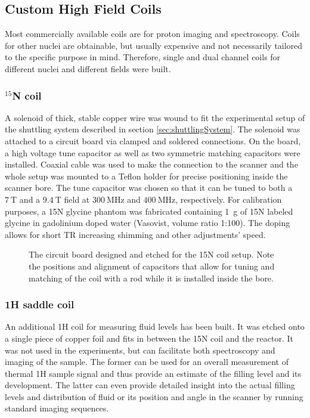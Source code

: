         \subsection{Custom High Field Coils}
            Most commercially available coils are for proton imaging and spectroscopy. Coils for other nuclei are obtainable, but usually expensive and not necessarily tailored to the specific purpose in mind. Therefore, single and dual channel coils for different nuclei and different fields were built.
            \subsubsection{$^{15}$N coil}
            \label{sec:matMeth:15Ncoil}
                A solenoid of thick, stable copper wire was wound to fit the experimental setup of the shuttling system described in section \ref{sec:shuttlingSystem}. The solenoid was attached to a circuit board via clamped and soldered connections. On the board, a high voltage tune capacitor as well as two symmetric matching capacitors were installed. Coaxial cable was used to make the connection to the scanner and the whole setup was mounted to a Teflon holder for precise positioning inside the scanner bore. The tune capacitor was chosen so that it can be tuned to both a $\SI{7}{\tesla}$ and a $\SI{9.4}{\tesla}$ field at $\SI{300}{\MHz}$ and $\SI{400}{\MHz}$, respectively.
                For calibration purposes, a 15N glycine phantom was fabricated containing \SI{1}{\gram} of 15N labeled glycine in gadolinium  doped water (Vasovist, volume ratio 1:100). The doping allows for short TR increasing shimming and other adjustments' speed.
                \begin{figure}
                    \label{figure:matMeth:15NcircuitBoard}
                    \caption[15N circuit board]{The circuit board designed and etched for the 15N coil setup. Note the positions and alignment of capacitors that allow for tuning and matching of the coil with a rod while it is installed inside the bore.}
                \end{figure}
            \subsubsection{1H saddle coil} 
            An additional 1H coil for measuring fluid levels has been built. It was etched onto a single piece of copper foil and fits in between the 15N coil and the reactor. It was not used in the experiments, but can facilitate both spectroscopy and imaging of the sample. The former can be used for an overall measurement of thermal 1H sample signal and thus provide an estimate of the filling level and its development. The latter can even provide detailed insight into the actual filling levels and distribution of fluid or its position and angle in the scanner by running standard imaging sequences.
